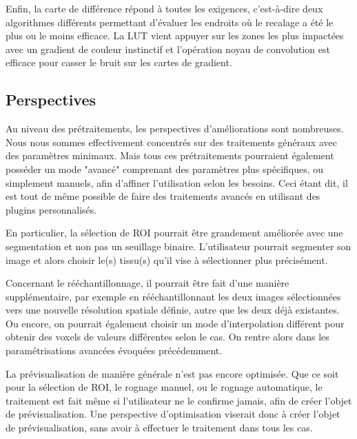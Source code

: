 \documentclass{article}
\begin{document}
{{        \bigskip

        Enfin, la carte de différence répond à toutes les exigences, c'est-à-dire deux algorithmes différents permettant d'évaluer les endroits où le recalage a été le plus ou le moins efficace. La LUT vient appuyer sur les zones les plus impactées avec un gradient de couleur instinctif et l'opération noyau de convolution est efficace pour casser le bruit sur les cartes de gradient.

        \bigskip
    }

    {
        \bigskip
        \subsection{Perspectives}

        Au niveau des prétraitements, les perspectives d'améliorations sont nombreuses. Nous nous sommes effectivement concentrés sur des traitements généraux avec des paramètres minimaux. Mais tous ces prétraitements pourraient également posséder un mode "avancé" comprenant des paramètres plus spécifiques, ou simplement manuels, afin d'affiner l'utilisation selon les besoins. Ceci étant dit, il est tout de même possible de faire des traitements avancés en utilisant des plugins personnalisés.

        En particulier, la sélection de ROI pourrait être grandement améliorée avec une segmentation et non pas un seuillage binaire. L'utilisateur pourrait segmenter son image et alors choisir le(s) tissu(s) qu'il vise à sélectionner plus précisément.

        Concernant le rééchantillonnage, il pourrait être fait d'une manière supplémentaire, par exemple en rééchantillonnant les deux images sélectionnées vers une nouvelle résolution spatiale définie, autre que les deux déjà existantes. Ou encore, on pourrait également choisir un mode d'interpolation différent pour obtenir des voxels de valeurs différentes selon le cas. On rentre alors dans les paramétrisations avancées évoquées précédemment.

        \bigskip

        La prévisualisation de manière générale n'est pas encore optimisée. Que ce soit pour la sélection de ROI, le rognage manuel, ou le rognage automatique, le traitement est fait même si l'utilisateur ne le confirme jamais, afin de créer l'objet de prévisualisation. Une perspective d'optimisation viserait donc à créer l'objet de prévisualisation, sans avoir à effectuer le traitement dans tous les cas.

}}
\end{document}
